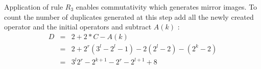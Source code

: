 Application of rule $R_{3}$ enables commutativity which generates mirror images. To count the number of duplicates generated at this step add all the newly created operator and the initial operators and subtract $A(k)$ :
\begin{eqnarray*}
	D &=& 2 + 2*C - A(k) \nonumber \\
	  &=& 2 + 2^r (3^l - 2^l - 1) - 2 (2^l - 2) - (2^k - 2) \nonumber \\
	  &=& 3^l 2^r - 2^{k+1} - 2^r - 2^{l+1} +  8 \nonumber \\
\end{eqnarray*}